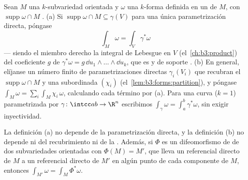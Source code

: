 \begin{definition}\label{def:b3:forms:integral}
Sean $M$ una $k$-subvariedad orientada y $\omega$ una $k$-forma definida
en un  de $M$, con
$\operatorname{supp}\omega \cap M$
. (a) Si
$\operatorname{supp}\omega \cap M \subseteq
\gamma(V)$ para una única parametrización directa, póngase
\[
\int_M\omega = \int_V\gamma^*\omega
\]
--- siendo el miembro derecho la integral de Lebesgue en $V$
(el~\cref{ch:b3:product}) del coeficiente $g$ de
$\gamma^*\omega = g\,\dd u_1\wedge\dots\wedge\dd u_k$, que es
 y de soporte
. (b) En general, elíjanse un
número finito de parametrizaciones directas $\gamma_i(V_i)$ que recubran
el 
$\operatorname{supp}\omega \cap M$ y una
 subordinada
$(\chi_i)$ (el~\cref{lem:b3:forms:partition}), y póngase $\int_M\omega =
\sum_i\int_M\chi_i\,\omega$, calculando cada término por (a). Para una
curva ($k = 1$) parametrizada por $\gamma\colon\intcc ab\to\R^n$
escribimos $\int_\gamma\omega = \int_a^b\gamma^*\omega$, sin exigir
inyectividad.
\end{definition}

\begin{lemma}[Consistencia]\label{lem:b3:forms:consistency}
La definición (a) no depende de la parametrización directa, y la
definición (b) no depende ni del recubrimiento ni de la
. Además, si
$\Phi$ es un difeomorfismo de
 de dos subvariedades
orientadas con $\Phi(M) = M'$, que lleva un referencial directo de $M$ a
un referencial directo de $M'$ en algún punto de cada componente de $M$,
entonces $\int_{M'}\omega =
\int_M\Phi^*\omega$.
\end{lemma}

